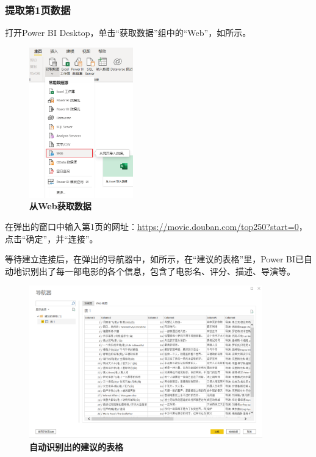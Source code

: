 \subsubsection{提取第1页数据}

打开Power BI Desktop，单击``获取数据''组中的``Web''，如所示。

\begin{figure}[htbp]
    \centering
    \includegraphics[width=0.4\textwidth]{figure/PowerBI/douban_import_from_web.png}
    \caption{\textbf{从Web获取数据}}
    \label{fig:douban_import_from_web}
\end{figure}

在弹出的窗口中输入第1页的网址：\url{https://movie.douban.com/top250?start=0}，点击``确定''，并``连接''。

等待建立连接后，在弹出的导航器中，如所示，在``建议的表格''里，Power BI已自动地识别出了每一部电影的各个信息，包含了电影名、评分、描述、导演等。

\begin{figure}[htbp]
    \centering
    \includegraphics[width=0.9\textwidth]{figure/PowerBI/douban_advice_table.png}
    \caption{\textbf{自动识别出的建议的表格}}
    \label{fig:douban_advice_table}
\end{figure}

